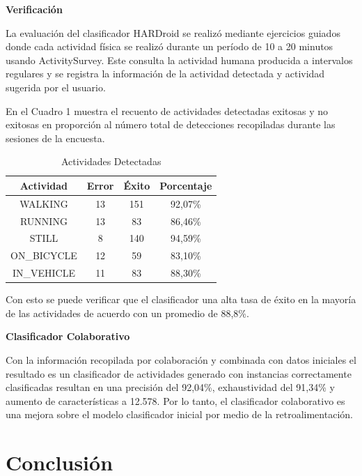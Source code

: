 \documentclass{sciposter}
\begin{document}
\begin{multicols}{3}
\textbf{Verificación}

La evaluación del clasificador HARDroid se realizó mediante ejercicios guiados donde cada actividad física se realizó durante un período de 10 a 20 minutos usando ActivitySurvey. Este consulta la actividad humana producida a intervalos regulares y se registra la información de la actividad detectada y actividad sugerida por el usuario.

En el Cuadro 1 muestra el recuento de actividades detectadas exitosas y no exitosas en proporción al número total de detecciones recopiladas durante las sesiones de la encuesta.

\begin{table}[!tbph]
\begin{centering}
	\begin{tabular}{|c|c|c|c|}
		\hline 
		\textbf{Actividad} & \textbf{Error} & \textbf{Éxito} & \textbf{Porcentaje} \\ 
		\hline 
		WALKING & 13 & 151 & 92,07\% \\ 
		\hline 
		RUNNING & 13 & 83 & 86,46\% \\ 
		\hline 
		STILL & 8 & 140 & 94,59\% \\ 
		\hline 
		ON\_BICYCLE & 12 & 59 & 83,10\% \\ 
		\hline 
		IN\_VEHICLE & 11 & 83 & 88,30\% \\ 
		\hline 
	\end{tabular} 
\par\end{centering}
\caption{Actividades Detectadas}
\end{table}

Con esto se puede verificar que el clasificador una alta tasa de éxito en la mayoría de las actividades de acuerdo con un promedio de 88,8\%.

\textbf{Clasificador Colaborativo}

Con la información recopilada por colaboración y combinada con datos iniciales el resultado es un clasificador de actividades generado con instancias correctamente clasificadas resultan en una precisión del 92,04\%, exhaustividad del 91,34\% y aumento de características a 12.578. Por lo tanto, el clasificador colaborativo es una mejora sobre el modelo clasificador inicial por medio de la retroalimentación.

\section{Conclusión}


\end{multicols}
\end{document}
